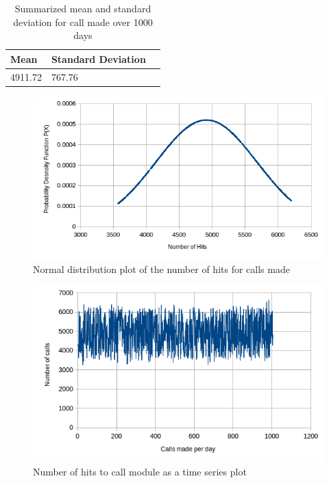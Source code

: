\documentclass[12pt, letterpaper, titlepage]{report}
\begin{document}
\begin{table}[h!]
	\centering
	\begin{tabular}{|l|l|l|}
		\hline
		\textbf{Mean} & \textbf{Standard Deviation} \\ \hline
		4911.72        & 767.76                        \\ \hline
	\end{tabular}
	\caption{Summarized mean and standard deviation for call made over 1000 days}
	\label{exp2_tab1}
\end{table}

\begin{figure}[h]
	\centering
	\includegraphics{call_hits_normal_distribution.png}
	\caption{Normal distribution plot of the number of hits for calls made}
	\label{exp2_fig1}
\end{figure}

\begin{figure}[h]
	\centering
	\includegraphics{time_series_plot_call_hit.png}
	\caption{Number of hits to call module as a time series plot}
	\label{exp2_fig2}
\end{figure}
\end{document}
